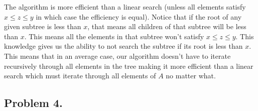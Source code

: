 \documentclass[11pt, letterpaper, titlepage]{article}
\begin{document}
The algorithm is more efficient than a linear search (unless all elements satisfy $x \leq z \leq y$ in which case the efficiency is equal). Notice that if the root of any given subtree is less than $x$, that means all children of that subtree will be less than $x$. This means all the elements in that subtree won't satisfy $x \leq z \leq y$. This knowledge gives us the ability to not search the subtree if its root is less than $x$. This means that in an average case, our algorithm doesn't have to iterate recursively through all elements in the tree making it more efficient than a linear search which must iterate through all elements of $A$ no matter what.

\newpage
\subsection*{Problem 4.}
\end{document}
